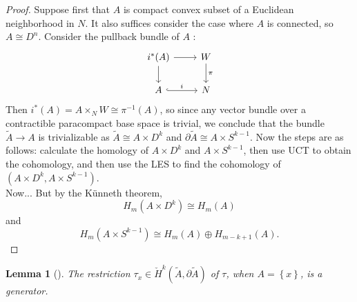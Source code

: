 \documentclass[reqno]{amsart}
\newtheorem{lemma}[theorem]{Lemma}
\theoremstyle{definition}
\theoremstyle{remark}
\begin{document}
\begin{proof}
    Suppose first that
    $A$ is compact convex subset
    of a Euclidean neighborhood in $N$. It also
    suffices consider the case where $A$ is connected,
    so $A \cong D^{n}$.
    Consider the pullback bundle of $A$ :
    \begin{equation*}
    \begin{tikzcd}
        i^{*}(A) \ar[r] \ar[d] & W \ar[d, "\pi"] \\
        A \ar[r, hookrightarrow, "i"] & N
    \end{tikzcd}
    \end{equation*}
    Then
    $i^{*}(A) =
    A \times_{N} W \cong
    \pi^{-1}(A)$, so
    since any vector bundle over a contractible paracompact
    base space is trivial, we conclude that 
    the bundle
    $\tilde{A} \to A$ is trivializable as
    $\tilde{A} \cong A \times D^{k}$ 
    and $\partial \tilde{A} \cong
    A \times S^{k-1}$.
    Now the steps are as follows: calculate
    the homology of 
    $A \times D^{k} $ and
    $A \times S^{k-1} $, then use UCT to obtain
    the cohomology, and then use the LES to find the cohomology
    of
    $\left( A \times D^{k}, A \times S^{k-1} \right) $.\\
    Now...
    But
    by the Künneth theorem,
    \[
    H_m(A \times D^{k}) \cong
    H_m(A)
    \] 
    and
    \[
    H_m(A \times S^{k-1}) \cong
    H_m(A) \oplus H_{m-k+1}(A).
    \] 
\end{proof}


\begin{lemma}[]
    The restriction $\tau_x \in 
    \check{H}^{k}( \tilde{A}, \partial \tilde{A})$ of
    $\tau$, when $A = \left\{ x \right\} $, is a 
    generator.
\end{lemma}
\end{document}
